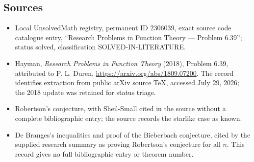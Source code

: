 \documentclass[11pt]{article}
\begin{document}
\subsection{Sources}
\begin{itemize}
\item Local UnsolvedMath registry, permanent ID 2306039, exact source code catalogue entry, ``Research Problems in Function Theory --- Problem 6.39''; status solved, classification SOLVED-IN-LITERATURE.
\item Hayman, \emph{Research Problems in Function Theory} (2018), Problem 6.39, attributed to P. L. Duren, \url{https://arxiv.org/abs/1809.07200}. The record identifies extraction from public arXiv source TeX, accessed July 29, 2026; the 2018 update was retained for status triage.
\item Robertson's conjecture, with Sheil-Small cited in the source without a complete bibliographic entry; the source records the starlike case as known.
\item De Branges's inequalities and proof of the Bieberbach conjecture, cited by the supplied research summary as proving Robertson's conjecture for all $n$. This record gives no full bibliographic entry or theorem number.
\end{itemize}
\end{document}
